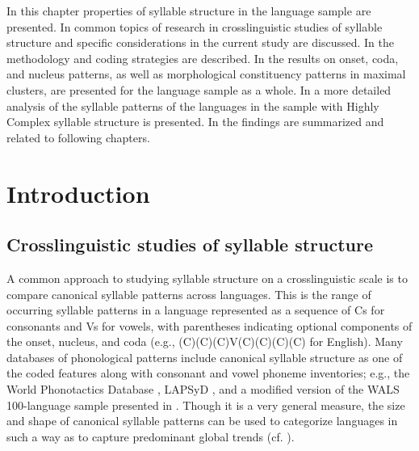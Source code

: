   In this chapter properties of syllable structure in the language sample are presented. In  common topics of research in crosslinguistic studies of syllable structure and specific considerations in the current study are discussed. In  the methodology and coding strategies are described. In  the results on onset, coda, and nucleus patterns, as well as morphological constituency patterns in maximal clusters, are presented for the language sample as a whole. In  a more detailed analysis of the syllable patterns of the languages in the sample with Highly Complex syllable structure is presented. In  the findings are summarized and related to following chapters.

\section{Introduction}\label{sec:3.1}
\subsection{Crosslinguistic studies of syllable structure}\label{sec:3.1.1}

  A common approach to studying syllable structure on a crosslinguistic scale is to compare canonical syllable patterns across languages. This is the range of occurring syllable patterns in a language represented as a sequence of Cs for consonants and Vs for vowels, with parentheses indicating optional components of the onset, nucleus, and coda (e.g., (C)(C)(C)V(C)(C)(C)(C) for English). Many databases of phonological patterns include canonical syllable structure as one of the coded features along with consonant and vowel phoneme inventories; e.g.,  the World Phonotactics Database \citep{DonohueEtAl2013}, LAPSyD \citep{MaddiesonEtAl2013}, and a modified version of the WALS 100-language sample presented in \citet{Gordon2016}. Though it is a very general measure, the size and shape of canonical syllable patterns can be used to categorize languages in such a way as to capture predominant global trends (cf. \citealt{Maddieson2013a}).

